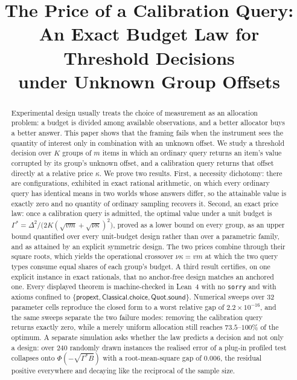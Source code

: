 \documentclass[conference]{IEEEtran}
\theoremstyle{definition}
\begin{document}
\title{The Price of a Calibration Query:\\
An Exact Budget Law for Threshold Decisions\\
under Unknown Group Offsets}

\author{
}

\maketitle

\begin{abstract}
Experimental design usually treats the choice of measurement as an allocation problem: a
budget is divided among available observations, and a better allocator buys a better
answer. This paper shows that the framing fails when the instrument sees the quantity of
interest only in combination with an unknown offset. We study a threshold decision over
$K$ groups of $m$ items in which an ordinary query returns an item's value corrupted by its
group's unknown offset, and a calibration query returns that offset directly at a relative
price $\kappa$. We prove two results. First, a necessity dichotomy: there are
configurations, exhibited in exact rational arithmetic, on which every ordinary query has
identical means in two worlds whose answers differ, so the attainable value is exactly zero
and no quantity of ordinary sampling recovers it. Second, an exact price law: once a
calibration query is admitted, the optimal value under a unit budget is
$\Gamma^{*}=\Delta^{2}/\bigl(2K(\sqrt{vm}+\sqrt{\nu\kappa})^{2}\bigr)$, proved as a lower bound
on every group, as an upper bound quantified over every unit-budget design rather than over
a parametric family, and as attained by an explicit symmetric design. The two prices
combine through their square roots, which yields the operational crossover $\nu\kappa=vm$ at
which the two query types consume equal shares of each group's budget. A third result
certifies, on one explicit instance in exact rationals, that no anchor-free design matches
an anchored one. Every displayed theorem is machine-checked in Lean~4 with no
\texttt{sorry} and with axioms confined to
$\{\textsf{propext},\textsf{Classical.choice},\textsf{Quot.sound}\}$. Numerical sweeps over
$32$ parameter cells reproduce the closed form to a worst relative gap of
$2.2\times10^{-16}$, and the same sweeps separate the two failure modes: removing the
calibration query returns exactly zero, while a merely uniform allocation still reaches
$73.5$--$100\%$ of the optimum. A separate simulation asks whether the law predicts a
decision and not only a design: over $240$ randomly drawn instances the realised error of a
plug-in profiled test collapses onto $\Phi(-\sqrt{\Gamma^{*}B})$ with a root-mean-square gap of
$0.006$, the residual positive everywhere and decaying like the reciprocal of the sample
size.
\end{abstract}
\end{document}
